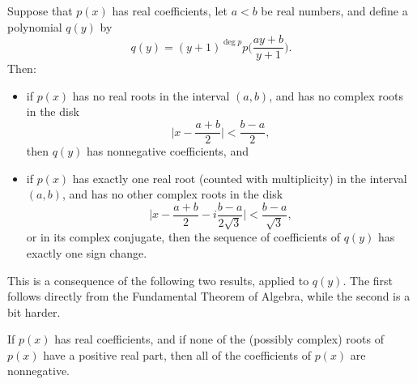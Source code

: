 \begin{thm} Suppose that $p(x)$ has real coefficients, let $a < b$ be real numbers, and define a polynomial $q(y)$ by
\[
q(y) = (y+1)^{\deg p}p\Big(\frac{ay + b}{y + 1}\Big).
\]
Then:
\begin{itemize}
\item if $p(x)$ has no real roots in the interval $(a,b)$, and has no complex roots in the disk
\[
\Big|x - \frac{a+b}{2}\Big| < \frac{b-a}{2},
\]
then $q(y)$ has nonnegative coefficients, and

\item if $p(x)$ has exactly one real root (counted with multiplicity) in the interval $(a,b)$, and has no other complex roots in the disk
\[
\Big|x - \frac{a+b}{2} - i\frac{b-a}{2\sqrt{3}}\Big| < \frac{b-a}{\sqrt{3}},
\]
or in its complex conjugate, then the sequence of coefficients of $q(y)$ has exactly one sign change.
\end{itemize}
\end{thm}

This is a consequence of the following two results, applied to $q(y)$. The first follows directly from the Fundamental Theorem of Algebra, while the second is a bit harder.

\begin{prop} If $p(x)$ has real coefficients, and if none of the (possibly complex) roots of $p(x)$ have a positive real part, then all of the coefficients of $p(x)$ are nonnegative.
\end{prop}

